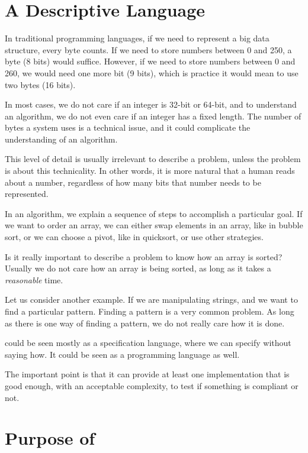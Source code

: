 \section{A Descriptive Language}

In traditional programming languages, if we need to represent a big data structure, every byte counts.
If we need to store numbers between 0 and 250, a byte (8 bits) would suffice.
However, if we need to store numbers between 0 and 260, we would need one more bit (9 bits), which is practice it would mean to use two bytes (16 bits).

In most cases, we do not care if an integer is 32-bit or 64-bit, and to understand an algorithm, we do not even care if an integer has a fixed length.
The number of bytes a system uses is a technical issue, and it could complicate the understanding of an algorithm.

This level of detail is usually irrelevant to describe a problem, unless the problem is about this technicality.
In other words, it is more natural that a human reads about a number, regardless of how many bits that number needs to be represented.

In an algorithm, we explain a sequence of steps to accomplish a particular goal.
If we want to order an array, we can either swap elements in an array, like in bubble sort, or we can choose a pivot, like in quicksort, or use other strategies.

Is it really important to describe a problem to know how an array is sorted?
Usually we do not care how an array is being sorted, as long as it takes a \textit{reasonable} time.

Let us consider another example.
If we are manipulating strings, and we want to find a particular pattern.
Finding a pattern is a very common problem.
As long as there is one way of finding a pattern, we do not really care how it is done.

\Soda could be seen mostly as a specification language, where we can specify without saying how.
It could be seen as a programming language as well.

The important point is that it can provide at least one implementation that is good enough, with an acceptable complexity, to test if something is compliant or not.


\section{Purpose of \Soda}

